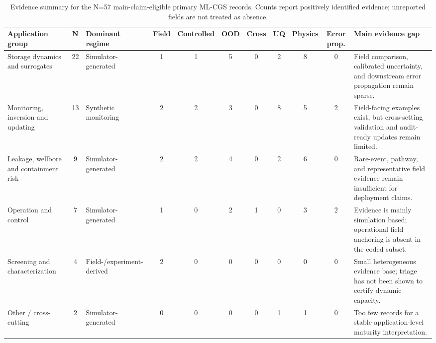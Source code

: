 \begin{table}[!htbp]
\centering
\caption{Evidence summary for the N=57 main-claim-eligible primary ML-CGS records. Counts report positively identified evidence; unreported fields are not treated as absence.}
\label{tab:core-summary}
\scriptsize
\setlength{\tabcolsep}{3.5pt}
\begin{tabularx}{\textwidth}{>{\RaggedRight\arraybackslash}p{} c >{\RaggedRight\arraybackslash}p{} c c c c c c c >{\RaggedRight\arraybackslash}X}
\toprule
Application group & N & Dominant regime & Field & Controlled & OOD & Cross & UQ & Physics & Error prop. & Main evidence gap \\
\midrule
Storage dynamics and surrogates & 22 & Simulator-generated & 1 & 1 & 5 & 0 & 2 & 8 & 0 & Field comparison, calibrated uncertainty, and downstream error propagation remain sparse. \\
Monitoring, inversion and updating & 13 & Synthetic monitoring & 2 & 2 & 3 & 0 & 8 & 5 & 2 & Field-facing examples exist, but cross-setting validation and audit-ready updates remain limited. \\
Leakage, wellbore and containment risk & 9 & Simulator-generated & 2 & 2 & 4 & 0 & 2 & 6 & 0 & Rare-event, pathway, and representative field evidence remain insufficient for deployment claims. \\
Operation and control & 7 & Simulator-generated & 1 & 0 & 2 & 1 & 0 & 3 & 2 & Evidence is mainly simulation based; operational field anchoring is absent in the coded subset. \\
Screening and characterization & 4 & Field-/experiment-derived & 2 & 0 & 0 & 0 & 0 & 0 & 0 & Small heterogeneous evidence base; triage has not been shown to certify dynamic capacity. \\
Other / cross-cutting & 2 & Simulator-generated & 0 & 0 & 0 & 0 & 1 & 1 & 0 & Too few records for a stable application-level maturity interpretation. \\
\bottomrule
\end{tabularx}
\end{table}
